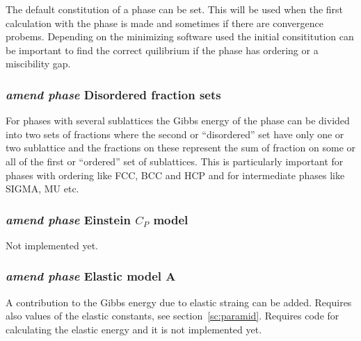 \documentclass[12pt]{article}
\begin{document}
The default constitution of a phase can be set.  This will be used
when the first calculation with the phase is made and sometimes if
there are convergence probems.  Depending on the minimizing software
used the initial consititution can be important to find the correct
quilibrium if the phase has ordering or a miscibility gap.

\subsubsection{{\em amend phase} Disordered fraction sets}

For phases with several sublattices the Gibbs energy of the phase can
be divided into two sets of fractions where the second or
``disordered'' set have only one or two sublattice and the fractions
on these represent the sum of fraction on some or all of the first or
``ordered'' set of sublattices.  This is particularly important for
phases with ordering like FCC, BCC and HCP and for intermediate phases
like SIGMA, MU etc.

\subsubsection{{\em amend phase} Einstein $C_P$ model}

Not implemented yet.

\subsubsection{{\em amend phase} Elastic model A}

A contribution to the Gibbs energy due to elastic straing can be
added.  Requires also values of the elastic constants, see
section~\ref{sc:paramid}.  Requires code for calculating the
elastic energy and it is not implemented yet.
\end{document}
